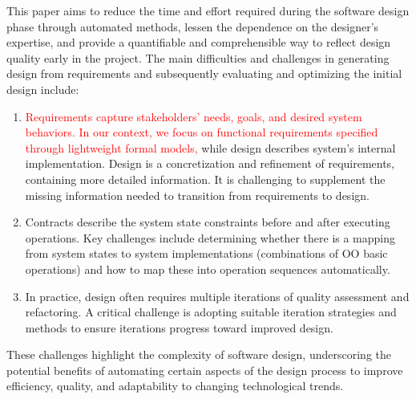 \documentclass[pdflatex,sn-mathphys-num]{sn-jnl}%
\theoremstyle{thmstyleone}%
\theoremstyle{thmstyletwo}%
\theoremstyle{thmstylethree}%
\begin{document}
This paper aims to reduce the time and effort required during the software design phase through automated methods, lessen the dependence on the designer's expertise, and provide a quantifiable and comprehensible way to reflect design quality early in the project. The main difficulties and challenges in generating design from requirements and subsequently evaluating and optimizing the initial design include:
\begin{enumerate}
    \item \textcolor{red}{Requirements capture stakeholders' needs, goals, and desired system behaviors. In our context, we focus on functional requirements specified through lightweight formal models,} while design describes system's internal implementation. Design is a concretization and refinement of requirements, containing more detailed information. It is challenging to supplement the missing information needed to transition from requirements to design.
    \item Contracts describe the system state constraints before and after executing operations. Key challenges include determining whether there is a mapping from system states to system implementations (combinations of OO basic operations) and how to map these into operation sequences automatically.
    \item In practice, design often requires multiple iterations of quality assessment and refactoring. A critical challenge is adopting suitable iteration strategies and methods to ensure iterations progress toward improved design.
\end{enumerate}

These challenges highlight the complexity of software design, underscoring the potential benefits of automating certain aspects of the design process to improve efficiency, quality, and adaptability to changing technological trends.
\end{document}
